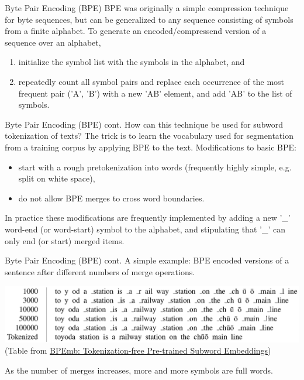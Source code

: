 \documentclass[style=upen, size=14pt]{powerdot}
\theoremstyle{definition}
\begin{document}
\begin{slide}[toc=Byte Pair Encoding]{Byte Pair Encoding (BPE)}
  BPE was originally a simple compression technique for byte sequences, but can
  be generalized to any sequence consisting of symbols from a finite alphabet.
  To generate an encoded/compressend version of a sequence over an alphabet,
  \begin{enumerate}
  \item initialize the symbol list with the symbols in the alphabet, and
  \item repeatedly count all symbol pairs and replace each occurrence of the
    most frequent pair ('A', 'B') with a new 'AB' element, and add 'AB' to the
    list of symbols.
  \end{enumerate}
\end{slide}
    
\begin{slide}[toc=]{Byte Pair Encoding (BPE) cont.}
  How can this technique be used for subword tokenization of texts? The trick is
  to learn the vocabulary used for segmentation from a training corpus by
  applying BPE to the text. Modifications to basic BPE:
  \begin{itemize}
  \item start with a rough pretokenization into words (frequently highly simple,
    e.g. split on white space),
  \item do not allow BPE merges to cross word boundaries.
  \end{itemize}
  In practice these modifications are frequently implemented by adding a new
  '\_' word-end (or word-start) symbol to the alphabet, and stipulating that
  '\_' can only end (or start) merged items.
\end{slide}

\begin{slide}[toc=]{Byte Pair Encoding (BPE) cont.}
  A simple example: BPE encoded versions of a sentence after different numbers
  of merge operations.
  \begin{center}
    \includegraphics[width=1.\textwidth]{figures/bpe.eps}
    \footnotesize(Table from \href{http://www.lrec-conf.org/proceedings/lrec2018/pdf/1049.pdf}{BPEmb: Tokenization-free Pre-trained Subword Embeddings})
  \end{center}
  As the number of merges increases, more and more symbols are full words.
\end{slide}
\end{document}
